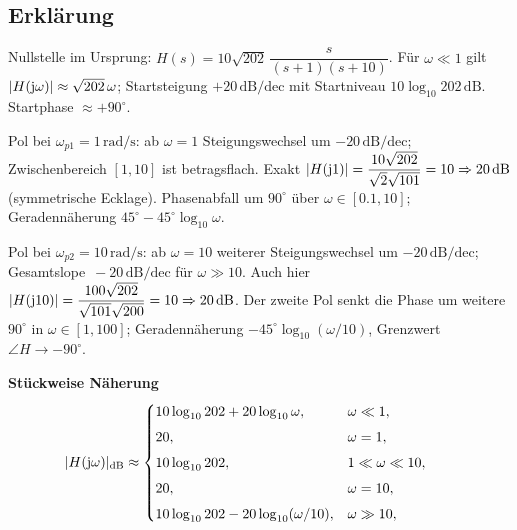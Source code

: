 \begin{center}
\end{center}
\newpage
\subsection{Erklärung}
\vspace{5mm}
\begin{description}[leftmargin=1.2em,labelsep=.6em,font=\bfseries]
\item[Schritt 1] Nullstelle im Ursprung: $H(s)=10\sqrt{202}\,\dfrac{s}{(s+1)(s+10)}$. Für $\omega\ll1$ gilt $|H(\operatorname{j}\!\omega)|\approx \sqrt{202}\,\omega$; Startsteigung $+20\,\mathrm{dB/dec}$ mit Startniveau $10\log_{10}202\,\mathrm{dB}$. Startphase $\approx+90^\circ$.
\item[Schritt 2] Pol bei $\omega_{p1}=1\,\mathrm{rad/s}$: ab $\omega=1$ Steigungswechsel um $-20\,\mathrm{dB/dec}$; Zwischenbereich $[1,10]$ ist betragsflach. Exakt $|H(\operatorname{j}\!1)|=\dfrac{10\sqrt{202}}{\sqrt{2}\sqrt{101}}=10\Rightarrow20\,\mathrm{dB}$ (symmetrische Ecklage). Phasenabfall um $90^\circ$ über $\omega\in[0.1,10]$; Geradennäherung $45^\circ-45^\circ\log_{10}\omega$.
\item[Schritt 3] Pol bei $\omega_{p2}=10\,\mathrm{rad/s}$: ab $\omega=10$ weiterer Steigungswechsel um $-20\,\mathrm{dB/dec}$; Gesamtslope $\,-20\,\mathrm{dB/dec}$ für $\omega\gg10$. Auch hier $|H(\operatorname{j}\!10)|=\dfrac{100\sqrt{202}}{\sqrt{101}\sqrt{200}}=10\Rightarrow20\,\mathrm{dB}$. Der zweite Pol senkt die Phase um weitere $90^\circ$ in $\omega\in[1,100]$; Geradennäherung $-45^\circ\log_{10}(\omega/10)$, Grenzwert $\angle H\to-90^\circ$.
\end{description}

\vspace{0.5cm}
\medskip
\noindent\textbf{Stückweise Näherung}
\[
|H(\operatorname{j}\!\omega)|_{\mathrm{dB}}\approx
\begin{cases}
10\log_{10}202+20\log_{10}\omega,& \omega\ll1,\\[4pt]
20,& \omega=1,\\[4pt]
10\log_{10}202,& 1\ll\omega\ll10,\\[4pt]
20,& \omega=10,\\[4pt]
10\log_{10}202-20\log_{10}(\omega/10),& \omega\gg10,
\end{cases}
\qquad
\]
\newpage
